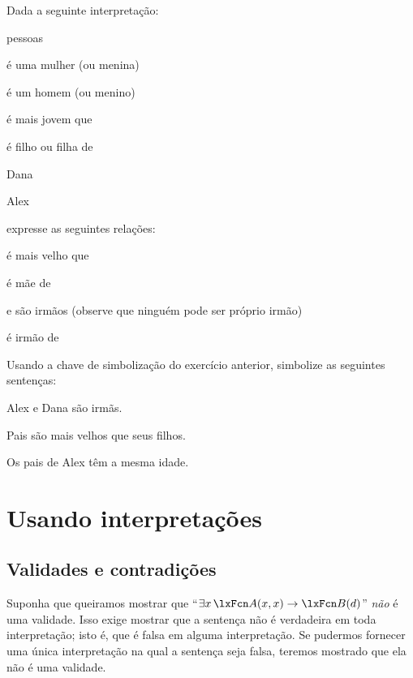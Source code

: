\problempart
Dada a seguinte interpretação:
\begin{ekey}
\item[\text{domínio}] pessoas
\item[\atom{W}{x}]  é uma mulher (ou menina)
\item[\atom{M}{x}]  é um homem (ou menino)
\item[\atom{Y}{x,y}]  é mais jovem que 
\item[\atom{O}{x,y}]  é filho ou filha de 
	\item[d] Dana
	\item[a] Alex
\end{ekey}
expresse as seguintes relações:
\begin{compactlist}
\item {} é mais velho que 
\item {} é mãe de 
\item {} e  são irmãos (observe que ninguém pode ser
		próprio irmão)
\item {} é irmão de 
\end{compactlist}

\problempart
Usando a chave de simbolização do exercício anterior, simbolize as seguintes sentenças:

\begin{compactlist}
\item Alex e Dana são irmãs.
\item Pais são mais velhos que seus filhos.
\item Os pais de Alex têm a mesma idade.
\end{compactlist}


\chapter{Usando interpretações}
\label{sec.UsingModels}

\section{Validades e contradições}
Suponha que queiramos mostrar que \textquotedblleft $\exists x\, \atom{A}{x,x} \eif \atom{B}{d}$\textquotedblright{} \emph{não} é uma validade. Isso exige mostrar que a sentença não é verdadeira em toda interpretação; isto é, que é falsa em alguma interpretação. Se pudermos fornecer uma única interpretação na qual a sentença seja falsa, teremos mostrado que ela não é uma validade.

